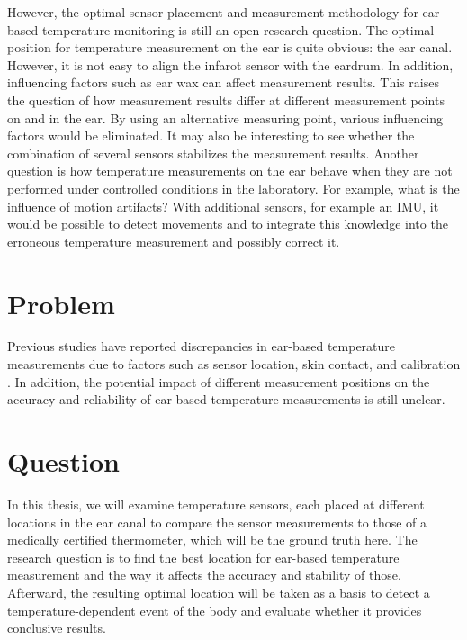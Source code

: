 However, the optimal sensor placement and measurement methodology for ear-based temperature monitoring is still an open research question. 
The optimal position for temperature measurement on the ear is quite obvious: the ear canal. However, it is not easy to align the infarot sensor with the eardrum. In addition, influencing factors such as ear wax can affect measurement results. 
This raises the question of how measurement results differ at different measurement points on and in the ear. 
By using an alternative measuring point, various influencing factors would be eliminated.
It may also be interesting to see whether the combination of several sensors stabilizes the measurement results.
Another question is how temperature measurements on the ear behave when they are not performed under controlled conditions in the laboratory.
For example, what is the influence of motion artifacts?
With additional sensors, for example an IMU, it would be possible to detect movements and to integrate this knowledge into the erroneous temperature measurement and possibly correct it.

\section{Problem}
Previous studies have reported discrepancies in ear-based temperature measurements due to factors such as sensor location, skin contact, and calibration \cite{gasimAccuracyTympanicTemperature2013, amoateng-adjepongAccuracyInfraredTympanic1999a, hookerScreeningFeverAdult1996a, cattaneoAccuracyPrecisionBody2000}. 
In addition, the potential impact of different measurement positions on the accuracy and reliability of ear-based temperature measurements is still unclear.


\section{Question}
In this thesis, we will examine temperature sensors, each placed at different locations in the ear canal to compare the sensor measurements to those of a medically certified thermometer, which will be the ground truth here. The research question is to find the best location for ear-based temperature measurement and the way it affects the accuracy and stability of those. Afterward, the resulting optimal location will be taken as a basis to detect a temperature-dependent event of the body and evaluate whether it provides conclusive results.

